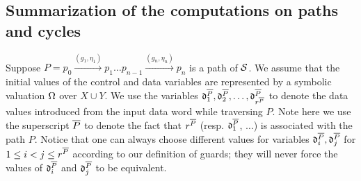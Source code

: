 \vspace{-4mm}
\subsection{Summarization of the computations on paths and cycles}\label{sec-sum}
\vspace{-1mm}

Suppose $P=p_0 \xrightarrow{(g_1,\eta_1)} p_1 \dots p_{n-1} \xrightarrow{(g_n,\eta_n)} p_{n}$ is a path of ${\mathcal{S} }$. We assume that the initial values of the control and data variables are represented by a symbolic valuation $\Omega$ over $X \cup Y$. 
We use the variables $\mathfrak{d}^{\overline{P}}_1,\mathfrak{d}^{\overline{P}}_2,\dots, \mathfrak{d}^{\overline{P}}_{r^{\overline{P}}}$ to denote the data values introduced from the input data word while traversing $P$. Note here we use the superscript ${\overline{P}}$ to denote the fact that $r^{\overline{P}}$ (resp. $\mathfrak{d}^{\overline{P}}_1$, $\dots$) is associated with the path $P$. Notice that one can always choose different values for variables $\mathfrak{d}^{\overline{P}}_i,\mathfrak{d}^{\overline{P}}_j$ for $1\leq i< j \leq r^{\overline{P}}$ according to our definition of guards; they will never force the values of $\mathfrak{d}^{\overline{P}}_i$ and $\mathfrak{d}^{\overline{P}}_j$ to be equivalent.



